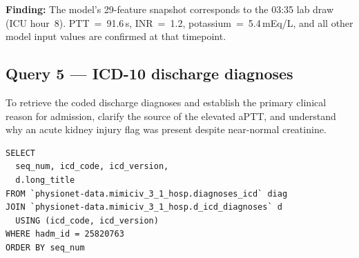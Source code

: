 \documentclass[12pt, a4paper]{article}
\begin{document}
\noindent\textbf{Finding:} The model's 29-feature snapshot corresponds to the 03:35 lab
draw (ICU hour~8). PTT~=~91.6\,s, INR~=~1.2, potassium~=~5.4\,mEq/L, and all
other model input values are confirmed at that timepoint.

\subsection*{Query 5 --- ICD-10 discharge diagnoses}

To retrieve the coded discharge diagnoses and establish the primary clinical
reason for admission, clarify the source of the elevated aPTT, and understand
why an acute kidney injury flag was present despite near-normal creatinine.

\begin{lstlisting}[style=sql]
SELECT
  seq_num, icd_code, icd_version,
  d.long_title
FROM `physionet-data.mimiciv_3_1_hosp.diagnoses_icd` diag
JOIN `physionet-data.mimiciv_3_1_hosp.d_icd_diagnoses` d
  USING (icd_code, icd_version)
WHERE hadm_id = 25820763
ORDER BY seq_num
\end{lstlisting}
\end{document}
